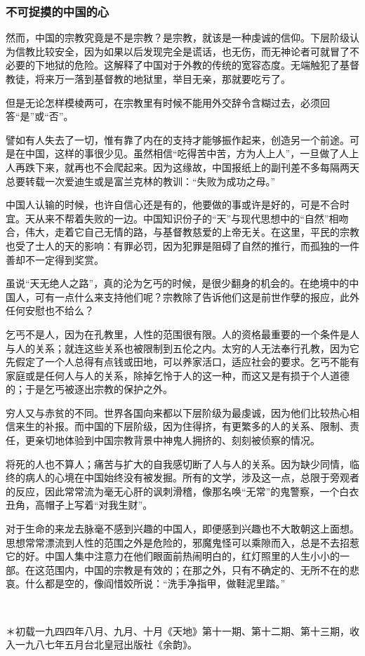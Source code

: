 \subsubsection*{不可捉摸的中国的心}
\par 然而，中国的宗教究竟是不是宗教？是宗教，就该是一种虔诚的信仰。下层阶级认为信教比较安全，因为如果以后发现完全是谎话，也无伤，而无神论者可就冒了不必要的下地狱的危险。这解释了中国对于外教的传统的宽容态度。无端触犯了基督教徒，将来万一落到基督教的地狱里，举目无亲，那就要吃亏了。
\par 但是无论怎样模棱两可，在宗教里有时候不能用外交辞令含糊过去，必须回答“是”或“否”。
\par 譬如有人失去了一切，惟有靠了内在的支持才能够振作起来，创造另一个前途。可是在中国，这样的事很少见。虽然相信“吃得苦中苦，方为人上人”，一旦做了人上人再跌下来，就再也不会爬起来。因为这缘故，中国报纸上的副刊差不多每隔两天总要转载一次爱迪生或是富兰克林的教训：“失败为成功之母。”
\par 中国人认输的时候，也许自信心还是有的，他要做的事或许是好的，可是不合时宜。天从来不帮着失败的一边。中国知识份子的“天”与现代思想中的“自然”相吻合，伟大，走着它自己无情的路，与基督教慈爱的上帝无关。在这里，平民的宗教也受了士人的天的影响：有罪必罚，因为犯罪是阻碍了自然的推行，而孤独的一件善却不一定得到奖赏。
\par 虽说“天无绝人之路”，真的沦为乞丐的时候，是很少翻身的机会的。在绝境中的中国人，可有一点什么来支持他们呢？宗教除了告诉他们这是前世作孽的报应，此外任何安慰也不给么？
\par 乞丐不是人，因为在孔教里，人性的范围很有限。人的资格最重要的一个条件是人与人的关系；就连这些关系也被限制到五伦之内。太穷的人无法奉行孔教，因为它先假定了一个人总得有点钱或田地，可以养家活口，适应社会的要求。乞丐不能有家庭或是任何人与人的关系，除掉乞怜于人的这一种，而这又是有损于个人道德的；于是乞丐被逐出宗教的保护之外。
\par 穷人又与赤贫的不同。世界各国向来都以下层阶级为最虔诚，因为他们比较热心相信来生的补报。而中国的下层阶级，因为住得挤，有更繁多的人的关系、限制、责任，更亲切地体验到中国宗教背景中神鬼人拥挤的、刻刻被侦察的情况。
\par 将死的人也不算人；痛苦与扩大的自我感切断了人与人的关系。因为缺少同情，临终的病人的心境在中国始终没有被发掘。所有的文学，涉及这一点，总限于旁观者的反应，因此常常流为毫无心肝的讽刺滑稽，像那名唤“无常”的鬼警察，一个白衣丑角，高帽子上写着“对我生财”。
\par 对于生命的来龙去脉毫不感到兴趣的中国人，即便感到兴趣也不大敢朝这上面想。思想常常漂流到人性的范围之外是危险的，邪魔鬼怪可以乘隙而入，总是不去招惹它的好。中国人集中注意力在他们眼面前热闹明白的，红灯照里的人生小小的一部。在这范围内，中国的宗教是有效的；在那之外，只有不确定的、无所不在的悲哀。什么都是空的，像阎惜姣所说：“洗手净指甲，做鞋泥里踏。”
\par  
\par ＊初载一九四四年八月、九月、十月《天地》第十一期、第十二期、第十三期，收入一九八七年五月台北皇冠出版社《余韵》。


